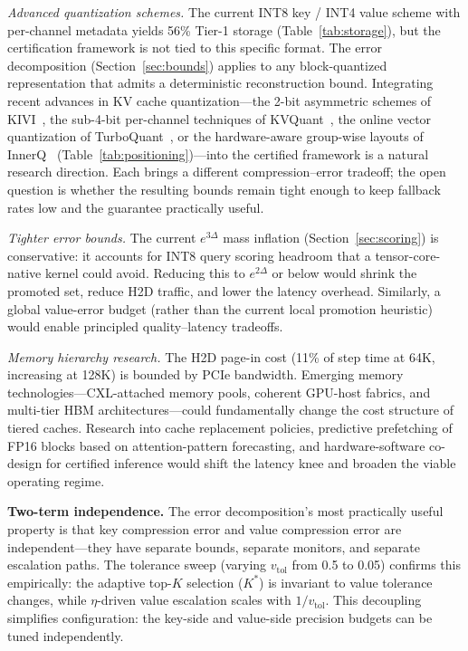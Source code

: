 \documentclass[10pt,twocolumn,a4paper]{article}
\theoremstyle{definition}
\theoremstyle{remark}
\begin{document}
\emph{Advanced quantization schemes.}  The current INT8 key / INT4 value scheme with per-channel metadata yields 56\% Tier-1 storage (Table~\ref{tab:storage}), but the certification framework is not tied to this specific format.  The error decomposition (Section~\ref{sec:bounds}) applies to any block-quantized representation that admits a deterministic reconstruction bound.  Integrating recent advances in KV cache quantization---the 2-bit asymmetric schemes of KIVI~\cite{kivi}, the sub-4-bit per-channel techniques of KVQuant~\cite{kvquant}, the online vector quantization of TurboQuant~\cite{turboquant}, or the hardware-aware group-wise layouts of InnerQ~\cite{innerq} (Table~\ref{tab:positioning})---into the certified framework is a natural research direction.  Each brings a different compression--error tradeoff; the open question is whether the resulting bounds remain tight enough to keep fallback rates low and the guarantee practically useful.

\emph{Tighter error bounds.}  The current $e^{3\Delta}$ mass inflation (Section~\ref{sec:scoring}) is conservative: it accounts for INT8 query scoring headroom that a tensor-core-native kernel could avoid.  Reducing this to $e^{2\Delta}$ or below would shrink the promoted set, reduce H2D traffic, and lower the latency overhead.  Similarly, a global value-error budget (rather than the current local promotion heuristic) would enable principled quality--latency tradeoffs.

\emph{Memory hierarchy research.}  The H2D page-in cost (11\% of step time at 64K, increasing at 128K) is bounded by PCIe bandwidth.  Emerging memory technologies---CXL-attached memory pools, coherent GPU-host fabrics, and multi-tier HBM architectures---could fundamentally change the cost structure of tiered caches.  Research into cache replacement policies, predictive prefetching of FP16 blocks based on attention-pattern forecasting, and hardware-software co-design for certified inference would shift the latency knee and broaden the viable operating regime.

\textbf{Two-term independence.}  The error decomposition's most practically useful property is that key compression error and value compression error are independent---they have separate bounds, separate monitors, and separate escalation paths.  The tolerance sweep (varying $v_{\mathrm{tol}}$ from 0.5 to 0.05) confirms this empirically: the adaptive top-$K$ selection ($K^*$) is invariant to value tolerance changes, while $\eta$-driven value escalation scales with $1/v_{\mathrm{tol}}$.  This decoupling simplifies configuration: the key-side and value-side precision budgets can be tuned independently.
\end{document}
